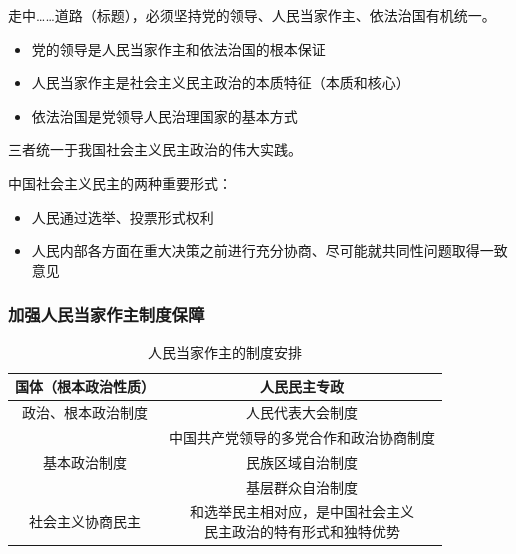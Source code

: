 \documentclass[12pt, a4paper, oneside]{ctexart}
\begin{document}
走中……道路（标题），必须坚持党的领导、人民当家作主、依法治国有机统一。
\begin{itemize}
  \item 党的领导是人民当家作主和依法治国的根本保证
  \item 人民当家作主是社会主义民主政治的本质特征（本质和核心）
  \item 依法治国是党领导人民治理国家的基本方式
\end{itemize}
三者统一于我国社会主义民主政治的伟大实践。

中国社会主义民主的两种重要形式：
\begin{itemize}
  \item 人民通过选举、投票形式权利
  \item 人民内部各方面在重大决策之前进行充分协商、尽可能就共同性问题取得一致意见
\end{itemize}

\subsubsection{加强人民当家作主制度保障}

\begin{table}
  \centering
  \caption{人民当家作主的制度安排}
  \begin{tabular}{|c|c|}
    \hline
    国体（根本政治性质） & 人民民主专政 \\ \hline
    政治、根本政治制度 & 人民代表大会制度 \\ \hline
    \multirow{3}{*}{基本政治制度} & 中国共产党领导的多党合作和政治协商制度 \\ \cline{2-2}
    & 民族区域自治制度 \\ \cline{2-2}
    & 基层群众自治制度 \\ \hline
    社会主义协商民主 & \makecell{和选举民主相对应，是中国社会主义\\ 民主政治的特有形式和独特优势} \\
    \hline
  \end{tabular}
\end{table}
\end{document}
